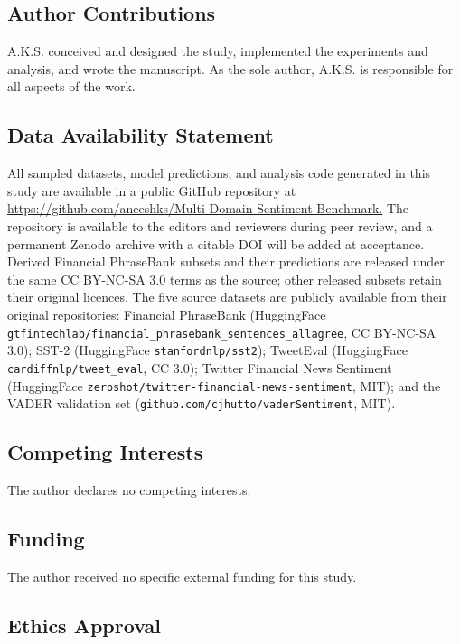 \documentclass[11pt]{article}
\begin{document}
\subsection{Author Contributions}\label{author-contributions}

A.K.S. conceived and designed the study, implemented the experiments and
analysis, and wrote the manuscript. As the sole author, A.K.S. is
responsible for all aspects of the work.

\subsection{Data Availability
Statement}\label{data-availability-statement}

All sampled datasets, model predictions, and analysis code generated in
this study are available in a public GitHub repository at
\url{https://github.com/aneeshks/Multi-Domain-Sentiment-Benchmark.} The
repository is available to the editors and reviewers during peer review,
and a permanent Zenodo archive with a citable DOI will be added at
acceptance. Derived Financial PhraseBank subsets and their predictions
are released under the same CC BY-NC-SA 3.0 terms as the source; other
released subsets retain their original licences. The five source
datasets are publicly available from their original repositories:
Financial PhraseBank (HuggingFace
\texttt{gtfintechlab/financial\_\allowbreak{}phrasebank\_\allowbreak{}sentences\_\allowbreak{}allagree}, CC
BY-NC-SA 3.0); SST-2 (HuggingFace \texttt{stanfordnlp/sst2}); TweetEval
(HuggingFace \texttt{cardiffnlp/tweet\_\allowbreak{}eval}, CC 3.0); Twitter Financial
News Sentiment (HuggingFace
\texttt{zeroshot/twitter-financial-news-sentiment}, MIT); and the VADER
validation set (\texttt{github.com/cjhutto/vaderSentiment}, MIT).

\subsection{Competing Interests}\label{competing-interests}

The author declares no competing interests.

\subsection{Funding}\label{funding}

The author received no specific external funding for this study.

\subsection{Ethics Approval}\label{ethics-approval}
\end{document}
